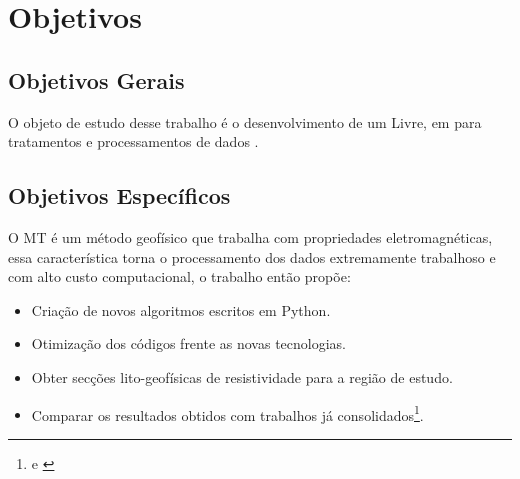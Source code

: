 
\chapter{Objetivos}
\label{cap-objetivos}

\section{Objetivos Gerais}
\label{cap-objetivos gerais}

    
    O objeto de estudo desse trabalho é o desenvolvimento de um  Livre, em  para tratamentos e processamentos de dados \MT.
    
\section{Objetivos Específicos}
\label{cap-objetivos especificos}

    O MT é um método geofísico que trabalha com propriedades eletromagnéticas, essa característica torna o processamento dos dados extremamente trabalhoso e com alto custo computacional, o trabalho então propõe:
    
    \begin{itemize}
     \item Criação de novos algoritmos escritos em Python.
     \item Otimização dos códigos frente as novas tecnologias.
     \item Obter secções lito-geofísicas de resistividade para a região de estudo.
     \item Comparar os resultados obtidos com trabalhos já consolidados\footnote{\cite{tese_andrea} e \cite{alane}}.
    \end{itemize}
